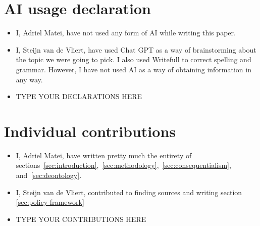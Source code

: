 \section{AI usage declaration}

\begin{itemize}
	\item  I, Adriel Matei, have not used any form of AI while writing this paper.
	\item I, Steijn van de Vliert, have used Chat GPT as a way of brainstorming about the topic we were going to pick. I also used Writefull to correct spelling and grammar. However, I have not used AI as a way of obtaining information in any way.
	\item TYPE YOUR DECLARATIONS HERE
\end{itemize}


\section{Individual contributions}

\begin{itemize}
	\item I, Adriel Matei, have written pretty much the entirety of sections~\ref{sec:introduction},~\ref{sec:methodology},~\ref{sec:consequentialism}, and~\ref{sec:deontology}.
	\item I, Steijn van de Vliert, contributed to finding sources and writing section \ref{sec:policy-framework}
	\item TYPE YOUR CONTRIBUTIONS HERE
\end{itemize}
